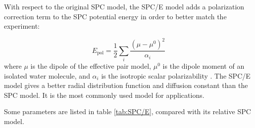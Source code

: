 With respect to the original SPC model, the SPC/E model adds a polarization
correction term to the SPC potential energy in order to better match
the experiment:

\[
E_{\mathrm{pol}}=\frac{1}{2}\sum_{i}\dfrac{(\mu-\mu^{0})^{2}}{\alpha_{i}}
\]
where $\mu$ is the dipole of the effective pair model, $\mu^{0}$
is the dipole moment of an isolated water molecule, and $\alpha_{i}$
is the isotropic scalar polarizability \citep{SPC/E}. The SPC/E model
gives a better radial distribution function and diffusion constant
than the SPC model. It is the most commonly used model for applications.

Some parameters are listed in table \ref{tab:SPC/E}, compared with
its relative SPC model.

\begin{table}[h]

\caption{Parameters for SPC and SPC/E water\label{tab:SPC/E}}
\end{table}


